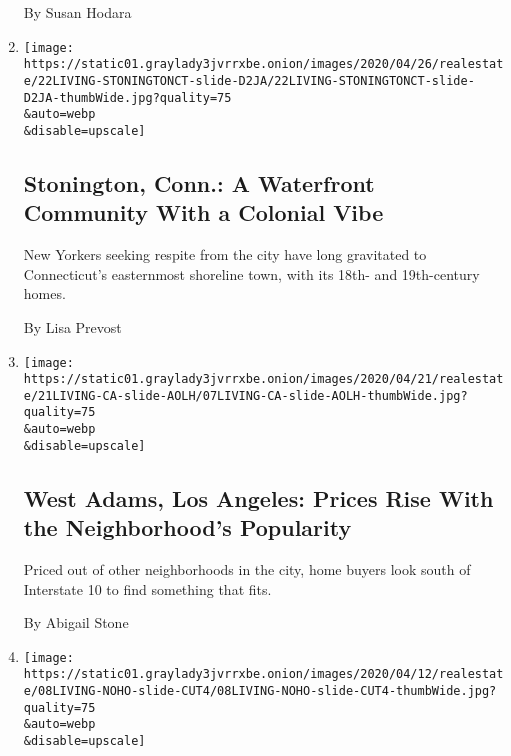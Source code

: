 \begin{enumerate}
  By Susan Hodara
\item
  \href{/2020/04/22/realestate/stonington-conn-a-waterfront-community-with-a-colonial-vibe.html}{}

  \texttt{[image: https://static01.graylady3jvrrxbe.onion/images/2020/04/26/realestate/22LIVING-STONINGTONCT-slide-D2JA/22LIVING-STONINGTONCT-slide-D2JA-thumbWide.jpg?quality=75\\\&auto=webp\\\&disable=upscale]}

  \hypertarget{stonington-conn-a-waterfront-community-with-a-colonial-vibe}{%
  \subsection{Stonington, Conn.: A Waterfront Community With a Colonial
  Vibe}\label{stonington-conn-a-waterfront-community-with-a-colonial-vibe}}

  New Yorkers seeking respite from the city have long gravitated to
  Connecticut's easternmost shoreline town, with its 18th- and
  19th-century homes.

  By Lisa Prevost
\item
  \href{/2020/04/21/realestate/west-adams-los-angeles-prices-rise-with-the-neighborhoods-popularity.html}{}

  \texttt{[image: https://static01.graylady3jvrrxbe.onion/images/2020/04/21/realestate/21LIVING-CA-slide-AOLH/07LIVING-CA-slide-AOLH-thumbWide.jpg?quality=75\\\&auto=webp\\\&disable=upscale]}

  \hypertarget{west-adams-los-angeles-prices-rise-with-the-neighborhoods-popularity}{%
  \subsection{West Adams, Los Angeles: Prices Rise With the
  Neighborhood's
  Popularity}\label{west-adams-los-angeles-prices-rise-with-the-neighborhoods-popularity}}

  Priced out of other neighborhoods in the city, home buyers look south
  of Interstate 10 to find something that fits.

  By Abigail Stone
\item
  \href{/2020/04/15/realestate/noho-nyc-restaurants-retail.html}{}

  \texttt{[image: https://static01.graylady3jvrrxbe.onion/images/2020/04/12/realestate/08LIVING-NOHO-slide-CUT4/08LIVING-NOHO-slide-CUT4-thumbWide.jpg?quality=75\\\&auto=webp\\\&disable=upscale]}

  \hypertarget{noho-manhattan-a-place-to-live-and-work-and-create}{%
}
\end{enumerate}
